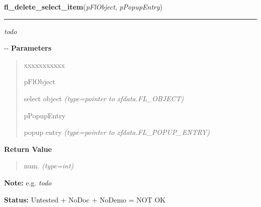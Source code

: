     \label{xformslib:flselect:fl_delete_select_item}

    \vspace{0.5ex}

\hspace{.8\funcindent}\begin{boxedminipage}{\funcwidth}

    \raggedright \textbf{fl\_delete\_select\_item}(\textit{pFlObject}, \textit{pPopupEntry})

    \vspace{-1.5ex}

    \rule{\textwidth}{0.5\fboxrule}
\setlength{\parskip}{2ex}

\emph{todo}

-{}-
\setlength{\parskip}{1ex}
      \textbf{Parameters}
      \vspace{-1ex}

      \begin{quote}
        \begin{Ventry}{xxxxxxxxxxx}

          \item[pFlObject]


select object
            {\it (type=pointer to xfdata.FL\_OBJECT)}

          \item[pPopupEntry]


popup entry
            {\it (type=pointer to xfdata.FL\_POPUP\_ENTRY)}

        \end{Ventry}

      \end{quote}

      \textbf{Return Value}
    \vspace{-1ex}

      \begin{quote}

num.
      {\it (type=int)}

      \end{quote}

\textbf{Note:} 
e.g. \emph{todo}


\textbf{Status:} 
Untested + NoDoc + NoDemo = NOT OK


    \end{boxedminipage}

    \label{xformslib:flselect:fl_set_select_items}

